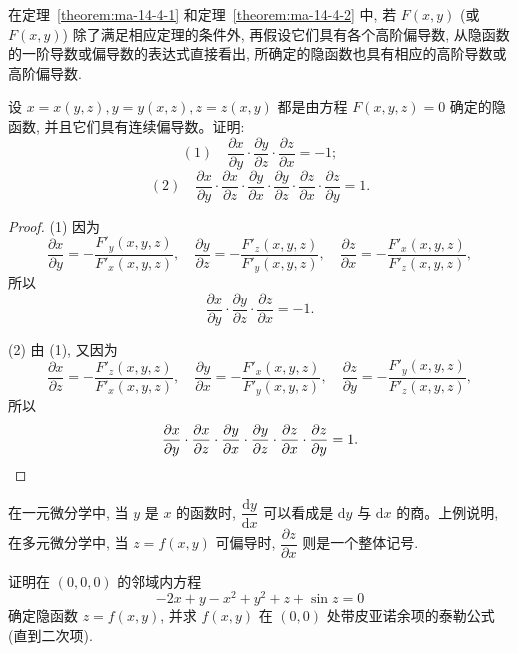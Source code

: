 \begin{remark}\label{remark:ma-14-source-84}
在定理~\ref{theorem:ma-14-4-1} 和定理~\ref{theorem:ma-14-4-2} 中, 若 $F(x,y)$ (或 $F(x,y)$) 除了满足相应定理的条件外, 再假设它们具有各个高阶偏导数, 从隐函数的一阶导数或偏导数的表达式直接看出, 所确定的隐函数也具有相应的高阶导数或高阶偏导数.
\end{remark}


\begin{example}\label{example:ma-14-4-1}
设 $x=x(y,z),y=y(x,z),z=z(x,y)$ 都是由方程 $F(x,y,z)=0$ 确定的隐函数, 并且它们具有连续偏导数。证明:
\[
  (1)\quad \frac{\partial x}{\partial y}\cdot
  \frac{\partial y}{\partial z}\cdot
  \frac{\partial z}{\partial x}=-1;
\]
\[
  (2)\quad \frac{\partial x}{\partial y}\cdot
  \frac{\partial x}{\partial z}\cdot
  \frac{\partial y}{\partial x}\cdot
  \frac{\partial y}{\partial z}\cdot
  \frac{\partial z}{\partial x}\cdot
  \frac{\partial z}{\partial y}=1.
\]
\end{example}


\begin{proof}
(1) 因为
\[
  \frac{\partial x}{\partial y}=-\frac{F'_y(x,y,z)}{F'_x(x,y,z)},\quad
  \frac{\partial y}{\partial z}=-\frac{F'_z(x,y,z)}{F'_y(x,y,z)},\quad
  \frac{\partial z}{\partial x}=-\frac{F'_x(x,y,z)}{F'_z(x,y,z)},
\]
所以
\[
  \frac{\partial x}{\partial y}\cdot
  \frac{\partial y}{\partial z}\cdot
  \frac{\partial z}{\partial x}=-1.
\]

(2) 由 (1), 又因为
\[
  \frac{\partial x}{\partial z}=-\frac{F'_z(x,y,z)}{F'_x(x,y,z)},\quad
  \frac{\partial y}{\partial x}=-\frac{F'_x(x,y,z)}{F'_y(x,y,z)},\quad
  \frac{\partial z}{\partial y}=-\frac{F'_y(x,y,z)}{F'_z(x,y,z)},
\]
所以
\[
  \frac{\partial x}{\partial y}\cdot
  \frac{\partial x}{\partial z}\cdot
  \frac{\partial y}{\partial x}\cdot
  \frac{\partial y}{\partial z}\cdot
  \frac{\partial z}{\partial x}\cdot
  \frac{\partial z}{\partial y}=1.
\qedhere
\]
\end{proof}


\begin{remark}\label{remark:ma-14-source-87}
在一元微分学中, 当 $y$ 是 $x$ 的函数时, $\dfrac{\mathrm dy}{\mathrm dx}$ 可以看成是 $\mathrm dy$ 与 $\mathrm dx$ 的商。上例说明, 在多元微分学中, 当 $z=f(x,y)$ 可偏导时, $\dfrac{\partial z}{\partial x}$ 则是一个整体记号.
\end{remark}


\begin{example}\label{example:ma-14-4-2}
证明在 $(0,0,0)$ 的邻域内方程
\begin{equation}
  -2x+y-x^2+y^2+z+\sin z=0
  \label{eq:ma-14-4-1}
\end{equation}
确定隐函数 $z=f(x,y)$, 并求 $f(x,y)$ 在 $(0,0)$ 处带皮亚诺余项的泰勒公式 (直到二次项).
\end{example}


